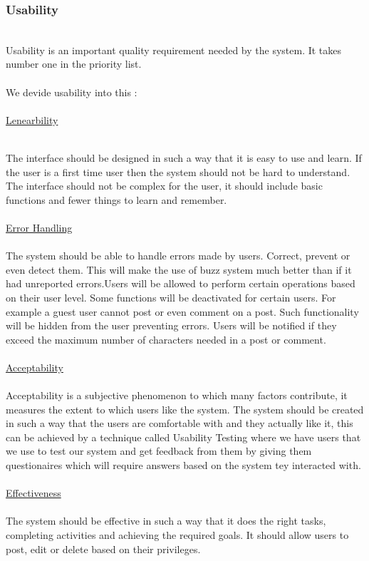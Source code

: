 ﻿\subsubsection{Usability}
\\Usability is an important quality requirement needed by the system. It takes number one in the priority list. \\
\\ We devide usability into this :\\
\\
\underline{Lenearbility\\}

\\ The interface should be designed in such a way that it is easy to use and learn. If the user is a first time user then the system should not be hard to understand. The interface should not be complex for the user, it should include basic functions and fewer things to learn and remember.\\
\\
\underline{Error Handling\\}
\\The system should be able to handle errors made by users. Correct, prevent or even detect them. This will make the use of buzz system much better than  if it had unreported errors.Users will be allowed to perform certain operations based on their user level. Some functions will be deactivated for certain users. For example a guest user cannot post or even comment on a post. Such functionality will be hidden from the user preventing errors. Users will be notified if they exceed the maximum number of characters needed in a post or comment.\\
\\
\underline{Acceptability\\}
\\
Acceptability is a subjective phenomenon to which many factors contribute, it measures the extent to which users like the system. The system should be created in such a way that the users are comfortable with and they actually like it, this can be achieved by  a technique called Usability Testing where  we have users that we use to test our system and get feedback from them by giving them questionaires which will require answers based on the system tey interacted with.\\
\\
\underline{Effectiveness \\}
\\The system should be effective in such a way that it does the right tasks, completing activities and achieving the required goals. It should allow users to post, edit or delete based on their privileges.\\

